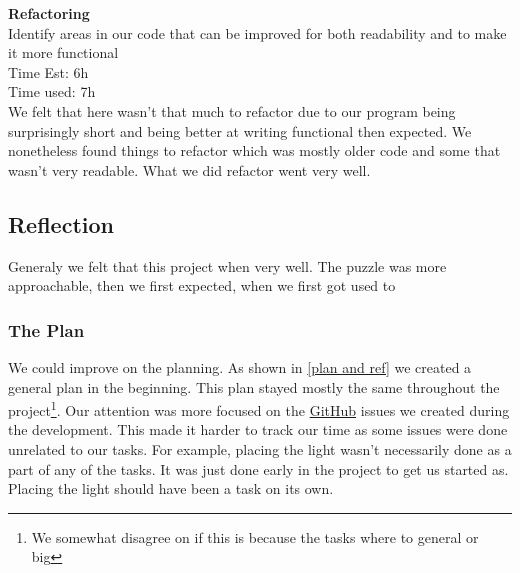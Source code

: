 \documentclass[12pt]{article}
\begin{document}
\textbf{Refactoring}\\
Identify areas in our code that can be improved for both readability and to make it more functional\\
Time Est: 6h\\
Time used: 7h\\
We felt that here wasn't that much to refactor due to our program being surprisingly short and being better at writing functional then expected. We nonetheless found things to refactor which was mostly older code and some that wasn't very readable. What we did refactor went very well.\\


\subsection{Reflection}
Generaly we felt that this project when very well. The puzzle was more approachable, then we first expected, when we first got used to 



\subsubsection{The Plan}


We could improve on the planning. As shown in \ref{plan and ref} we created a general plan in the beginning. This plan stayed mostly the same throughout the project\footnote{ We somewhat disagree on if this is because the tasks where to general or big }. Our attention was more focused on the \href{https://github.com/BANZZAAAIIII/IKT212_Akari}{GitHub}  issues we created during the development. This made it harder to track our time as some issues were done unrelated to our tasks. For example, placing the light wasn't necessarily done as a part of any of the tasks. It was just done early in the project to get us started as. Placing the light should have been a task on its own. 
\end{document}
